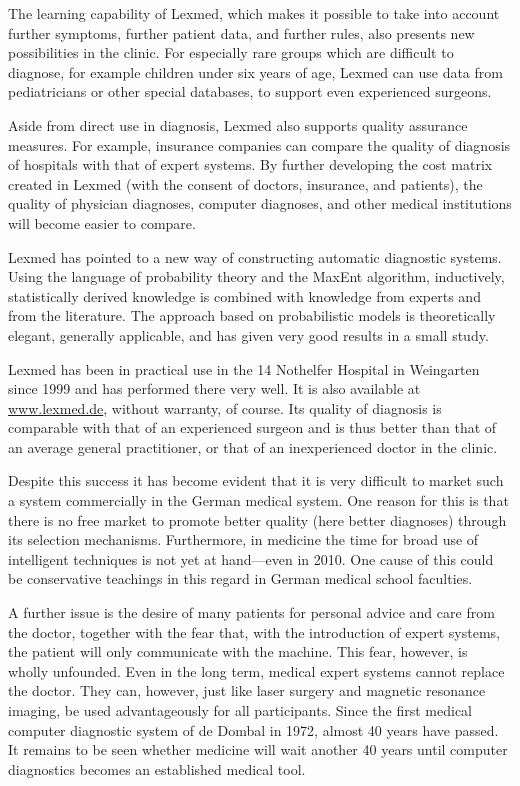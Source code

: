 \documentclass[10pt]{book}
\begin{document}
The learning capability of Lexmed, which makes it possible to take into account further symptoms, further patient data, and further rules, also presents new possibilities in the clinic. For especially rare groups which are difficult to diagnose, for example children under six years of age, Lexmed can use data from pediatricians or other special databases, to support even experienced surgeons.

Aside from direct use in diagnosis, Lexmed also supports quality assurance measures. For example, insurance companies can compare the quality of diagnosis of hospitals with that of expert systems. By further developing the cost matrix created in Lexmed (with the consent of doctors, insurance, and patients), the quality of physician diagnoses, computer diagnoses, and other medical institutions will become easier to compare.

Lexmed has pointed to a new way of constructing automatic diagnostic systems. Using the language of probability theory and the MaxEnt algorithm, inductively, statistically derived knowledge is combined with knowledge from experts and from the literature. The approach based on probabilistic models is theoretically elegant, generally applicable, and has given very good results in a small study.

Lexmed has been in practical use in the 14 Nothelfer Hospital in Weingarten since 1999 and has performed there very well. It is also available at \href{http://www.lexmed.de}{www.lexmed.de}, without warranty, of course. Its quality of diagnosis is comparable with that of an experienced surgeon and is thus better than that of an average general practitioner, or that of an inexperienced doctor in the clinic.

Despite this success it has become evident that it is very difficult to market such a system commercially in the German medical system. One reason for this is that there is no free market to promote better quality (here better diagnoses) through its selection mechanisms. Furthermore, in medicine the time for broad use of intelligent techniques is not yet at hand—even in 2010. One cause of this could be conservative teachings in this regard in German medical school faculties.

A further issue is the desire of many patients for personal advice and care from the doctor, together with the fear that, with the introduction of expert systems, the patient will only communicate with the machine. This fear, however, is wholly unfounded. Even in the long term, medical expert systems cannot replace the doctor. They can, however, just like laser surgery and magnetic resonance imaging, be used advantageously for all participants. Since the first medical computer diagnostic system of de Dombal in 1972, almost 40 years have passed. It remains to be seen whether medicine will wait another 40 years until computer diagnostics becomes an established medical tool.
\end{document}
